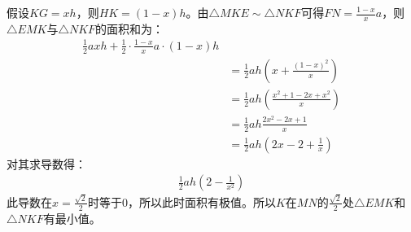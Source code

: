 \documentclass[answers]{exam}
\begin{document}
\begin{questions}
\begin{solution}
		假设$KG=xh$，则$HK=(1-x)h$。由$\triangle{MKE} \sim \triangle{NKF}$可得$FN =
			\frac{1-x}{x}a$，则$\triangle{EMK}$与$\triangle{NKF}$的面积和为：
		\begin{align*}
			\frac12axh + \frac12\cdot\frac{1-x}{x}a\cdot(1-x)h
			\\     & = \frac12ah(x + \frac{(1-x)^2}{x})
			\\     & = \frac12ah(\frac{x^2 + 1 - 2x + x^2}{x})
			\\   & = \frac12ah\frac{2x^2 - 2x + 1}{x}
			\\ & = \frac12ah(2x -2 + \frac1x)
		\end{align*}
		对其求导数得：
		\begin{align*}
			\frac12ah(2 - \frac{1}{x^2})
		\end{align*}
		此导数在$x =
			\frac{\sqrt{2}}{2}$时等于$0$，所以此时面积有极值。所以$K$在$MN$的$\frac{\sqrt{2}}{2}$处$\triangle{EMK}$和$\triangle{NKF}$有最小值。

	\end{solution}
\end{questions}
\end{document}
